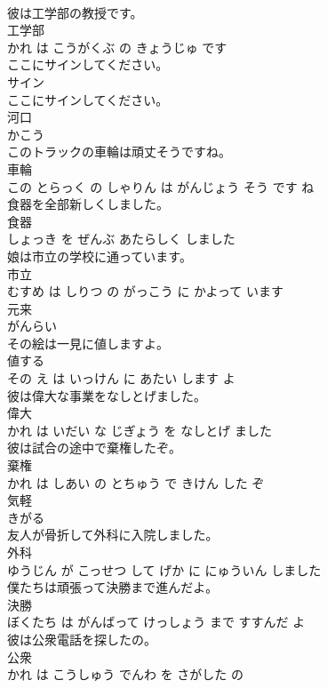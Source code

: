 \documentclass[8pt]{extreport}
\begin{document}
\begin{CJK}{UTF8}{min}
\\	彼は工学部の教授です。	
\\	工学部 
\\	かれ は こうがくぶ の きょうじゅ です			
\\	ここにサインしてください。	
\\	サイン 
\\	ここにサインしてください。			
\\	河口	
\\	かこう			
\\	このトラックの車輪は頑丈そうですね。	
\\	車輪 
\\	この とらっく の しゃりん は がんじょう そう です ね			
\\	食器を全部新しくしました。	
\\	食器 
\\	しょっき を ぜんぶ あたらしく しました			
\\	娘は市立の学校に通っています。	
\\	市立 
\\	むすめ は しりつ の がっこう に かよって います			
\\	元来	
\\	がんらい			
\\	その絵は一見に値しますよ。	
\\	値する 
\\	その え は いっけん に あたい します よ			
\\	彼は偉大な事業をなしとげました。	
\\	偉大 
\\	かれ は いだい な じぎょう を なしとげ ました			
\\	彼は試合の途中で棄権したぞ。	
\\	棄権 
\\	かれ は しあい の とちゅう で きけん した ぞ			
\\	気軽	
\\	きがる			
\\	友人が骨折して外科に入院しました。	
\\	外科 
\\	ゆうじん が こっせつ して げか に にゅういん しました			
\\	僕たちは頑張って決勝まで進んだよ。	
\\	決勝 
\\	ぼくたち は がんばって けっしょう まで すすんだ よ			
\\	彼は公衆電話を探したの。	
\\	公衆 
\\	かれ は こうしゅう でんわ を さがした の			

\end{CJK}
\end{document}
